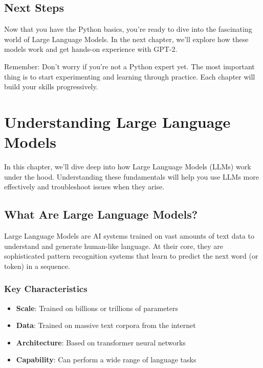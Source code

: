 \documentclass[
]{book}
\providecommand{\tightlist}{%
  \setlength{\itemsep}{0pt}\setlength{\parskip}{0pt}}
\begin{document}
\section{Next Steps}\label{next-steps}

Now that you have the Python basics, you're ready to dive into the fascinating world of Large Language Models. In the next chapter, we'll explore how these models work and get hands-on experience with GPT-2.

Remember: Don't worry if you're not a Python expert yet. The most important thing is to start experimenting and learning through practice. Each chapter will build your skills progressively.

\chapter{Understanding Large Language Models}\label{llm-fundamentals}

In this chapter, we'll dive deep into how Large Language Models (LLMs) work under the hood. Understanding these fundamentals will help you use LLMs more effectively and troubleshoot issues when they arise.

\section{What Are Large Language Models?}\label{what-are-large-language-models}

Large Language Models are AI systems trained on vast amounts of text data to understand and generate human-like language. At their core, they are sophisticated pattern recognition systems that learn to predict the next word (or token) in a sequence.

\subsection{Key Characteristics}\label{key-characteristics}

\begin{itemize}
\tightlist
\item
  \textbf{Scale}: Trained on billions or trillions of parameters
\item
  \textbf{Data}: Trained on massive text corpora from the internet
\item
  \textbf{Architecture}: Based on transformer neural networks
\item
  \textbf{Capability}: Can perform a wide range of language tasks
\end{itemize}
\end{document}
